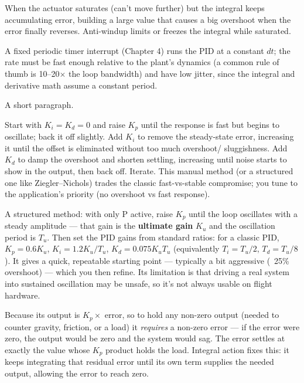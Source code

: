 When the actuator saturates (can't move further) but the integral keeps
accumulating error, building a large value that causes a big overshoot when the
error finally reverses. Anti-windup limits or freezes the integral while
saturated.

A fixed periodic timer interrupt (Chapter 4) runs the PID at a constant $dt$;
the rate must be fast enough relative to the plant's dynamics (a common rule of
thumb is 10--20$\times$ the loop bandwidth) and have low jitter, since the
integral and derivative math assume a constant period.

%
{A short paragraph.}

Start with $K_i = K_d = 0$ and raise $K_p$ until the response is fast but begins
to oscillate; back it off slightly. Add $K_i$ to remove the steady-state error,
increasing it until the offset is eliminated without too much overshoot/
sluggishness. Add $K_d$ to damp the overshoot and shorten settling, increasing
until noise starts to show in the output, then back off. Iterate. This manual
method (or a structured one like Ziegler--Nichols) trades the classic
fast-vs-stable compromise; you tune to the application's priority (no overshoot
vs fast response).

A structured method: with only P active, raise $K_p$ until the loop oscillates
with a steady amplitude --- that gain is the \textbf{ultimate gain} $K_u$ and the
oscillation period is $T_u$. Then set the PID gains from standard ratios: for a
classic PID, $K_p = 0.6K_u$, $K_i = 1.2K_u/T_u$, $K_d = 0.075K_uT_u$ (equivalently
$T_i = T_u/2$, $T_d = T_u/8$). It gives a quick, repeatable starting point ---
typically a bit aggressive (~25\% overshoot) --- which you then refine. Its
limitation is that driving a real system into sustained oscillation may be
unsafe, so it's not always usable on flight hardware.

Because its output is $K_p \times$ error, so to hold any non-zero output
(needed to counter gravity, friction, or a load) it \emph{requires} a non-zero
error --- if the error were zero, the output would be zero and the system would
sag. The error settles at exactly the value whose $K_p$ product holds the load.
Integral action fixes this: it keeps integrating that residual error until its
own term supplies the needed output, allowing the error to reach zero.


